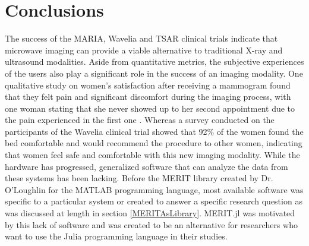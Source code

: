\setcounter{chapter}{6}
\setcounter{section}{0}
\setcounter{subsection}{0}
\chapter*{Conclusions}
The success of the MARIA, Wavelia and TSAR clinical trials indicate that microwave imaging can provide a viable
alternative to traditional X-ray and ultrasound modalities. Aside from quantitative metrics, the subjective experiences
of the users also play a significant role in the success of an imaging modality. One qualitative study on women's
satisfaction after receiving a mammogram found that they felt pain and significant discomfort during the imaging
process, with one woman stating that she never showed up to her second appointment due to the pain experienced in the
first one \cite{engelmanWomenSatisfactionTheir2006}. Whereas a survey conducted on the participants of the Wavelia
clinical trial showed that 92\% of the women found the bed comfortable and would recommend the procedure to other women,
indicating that women feel safe and comfortable with this new imaging modality. While the hardware has progressed,
generalized software that can analyze the data from these systems has been lacking. Before the MERIT library created by
Dr. O'Loughlin for the MATLAB programming language, most available software was specific to a particular system or
created to answer a specific research question as was discussed at length in section \ref{MERITAsLibrary}. MERIT.jl was
motivated by this lack of software and was created to be an alternative for researchers who want to use the Julia
programming language in their studies.

